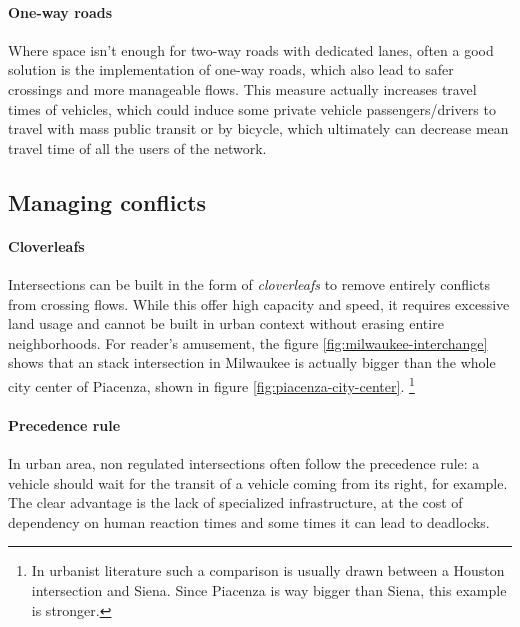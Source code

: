 \paragraph{One-way roads}

Where space isn't enough for two-way roads with dedicated lanes, often a good solution is the implementation of one-way roads, which also lead to safer crossings and more manageable flows. This measure actually increases travel times of vehicles, which could induce some private vehicle passengers/drivers to travel with mass public transit or by bicycle, which ultimately can decrease mean travel time of all the users of the network.

\subsection{Managing conflicts}

\paragraph{Cloverleafs}

Intersections can be built in the form of \textit{cloverleafs} to remove entirely conflicts from crossing flows. While this offer high capacity and speed, it requires excessive land usage and cannot be built in urban context without erasing entire neighborhoods. For reader's amusement, the figure \ref{fig:milwaukee-interchange} shows that an stack intersection in Milwaukee is actually bigger than the whole city center of Piacenza, shown in figure \ref{fig:piacenza-city-center}. \footnote{In urbanist literature such a comparison is usually drawn between a Houston intersection and Siena. Since Piacenza is way bigger than Siena, this example is stronger.}

\putimagecouple
{}
{}

\paragraph{Precedence rule}

In urban area, non regulated intersections often follow the precedence rule: a vehicle should wait for the transit of a vehicle coming from its right, for example. The clear advantage is the lack of specialized infrastructure, at the cost of dependency on human reaction times and some times it can lead to deadlocks.

